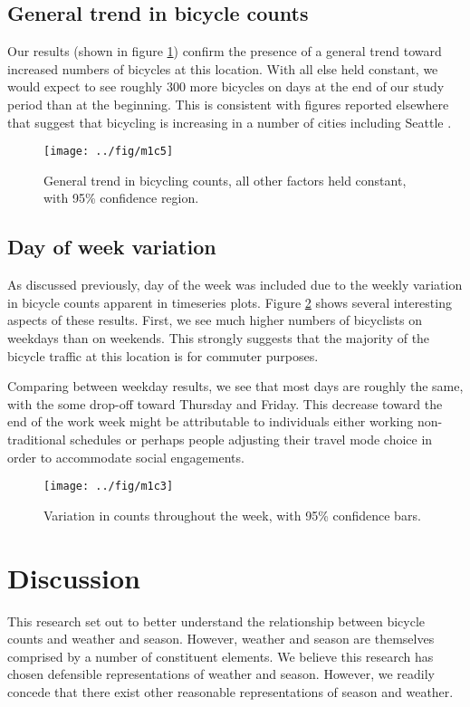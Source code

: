 \documentclass[12pt,letterpaper,article]{memoir}
\begin{document}
\FloatBarrier
\section*{General trend in bicycle counts}
Our results (shown in figure \ref{fg:trend}) confirm the presence of a
general trend toward increased numbers of bicycles at this location.
With all else held constant, we would expect to see roughly 300 more
bicycles on days at the end of our study period than at the beginning.
This is consistent with figures reported elsewhere that suggest that
bicycling is increasing in a number of cities including
Seattle \parencite{League-of-American-Bicyclists:aa}.

\begin{figure}[ht!]
  \centering
  \texttt{[image: ../fig/m1c5]}
  \caption{General trend in bicycling counts, all other factors held
    constant, with 95\% confidence region.}
  \label{fg:trend}
\end{figure}


\FloatBarrier
\section*{Day of week variation}
As discussed previously, day of the week was included due to the
weekly variation in bicycle counts apparent in timeseries plots.
Figure \ref{fg:dayofweek} shows several interesting aspects of these
results. First, we see much higher numbers of bicyclists on weekdays
than on weekends. This strongly suggests that the majority of the
bicycle traffic at this location is for commuter purposes.

Comparing between weekday results, we see that most days are roughly
the same, with the some drop-off toward Thursday and Friday. This
decrease toward the end of the work week might be attributable to
individuals either working non-traditional schedules or perhaps people
adjusting their travel mode choice in order to accommodate social
engagements.

\begin{figure}[ht!]
  \centering
  \texttt{[image: ../fig/m1c3]}
  \caption{Variation in counts throughout the week, with 95\% confidence bars.}
  \label{fg:dayofweek}
\end{figure}

\FloatBarrier
\chapter*{Discussion}
This research set out to better understand the relationship between
bicycle counts and weather and season. However, weather and season are
themselves comprised by a number of constituent elements. We believe
this research has chosen defensible representations of weather and
season. However, we readily concede that there exist other reasonable
representations of season and weather.
\end{document}

